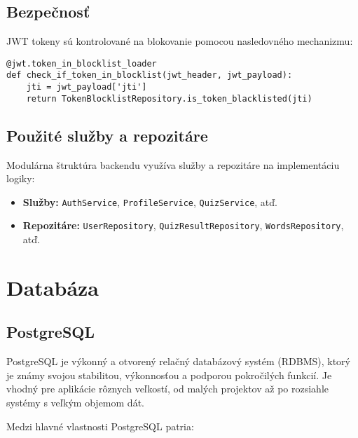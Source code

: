 \documentclass{article}
\begin{document}
\subsection{Bezpečnosť}
JWT tokeny sú kontrolované na blokovanie pomocou nasledovného mechanizmu:
\begin{lstlisting}
@jwt.token_in_blocklist_loader
def check_if_token_in_blocklist(jwt_header, jwt_payload):
    jti = jwt_payload['jti']
    return TokenBlocklistRepository.is_token_blacklisted(jti)
\end{lstlisting}

\subsection{Použité služby a repozitáre}
Modulárna štruktúra backendu využíva služby a repozitáre na implementáciu logiky:
\begin{itemize}
    \item \textbf{Služby:} \texttt{AuthService}, \texttt{ProfileService}, \texttt{QuizService}, atď.
    \item \textbf{Repozitáre:} \texttt{UserRepository}, \texttt{QuizResultRepository}, \texttt{WordsRepository}, atď.
\end{itemize}

\newpage
\section{Databáza}

\subsection{PostgreSQL}

PostgreSQL je výkonný a otvorený relačný databázový systém (RDBMS), ktorý je známy svojou stabilitou, výkonnosťou a podporou pokročilých funkcií. Je vhodný pre aplikácie rôznych veľkostí, od malých projektov až po rozsiahle systémy s veľkým objemom dát.

Medzi hlavné vlastnosti PostgreSQL patria:
\end{document}
